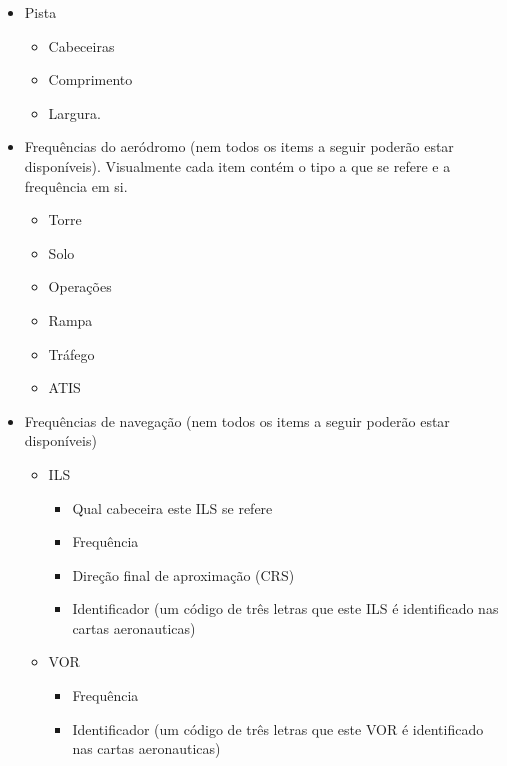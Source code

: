 \begin{itemize}
    \item Pista
        \begin {itemize}
        \item Cabeceiras
        \item Comprimento
        \item Largura.
        \end {itemize}
    \item Frequências do aeródromo (nem todos os items a seguir poderão estar disponíveis). Visualmente cada item contém o tipo a que se refere e a frequência em si.
    \begin{itemize}
        \item Torre
        \item Solo
        \item Operações
        \item Rampa
        \item Tráfego
        \item ATIS
    \end{itemize}
    \item Frequências de navegação (nem todos os items a seguir poderão estar disponíveis)
    \begin{itemize}
        \item ILS
            \begin{itemize}
                \item Qual cabeceira este ILS se refere
                \item Frequência
                \item Direção final de aproximação (CRS)
                \item Identificador (um código de três letras que este ILS é identificado nas cartas aeronauticas)
            \end{itemize}
        \item VOR
            \begin{itemize}
                \item Frequência
                \item Identificador (um código de três letras que este VOR é identificado nas cartas aeronauticas)
            \end{itemize}
    \end{itemize}


\end{itemize}
